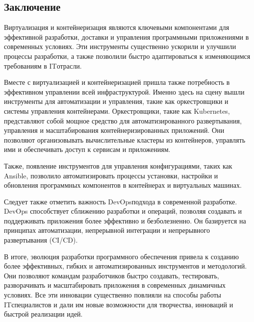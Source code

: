 \documentclass[letterpaper,10pt,russian]{sphinxmanual}
\begin{document}
\subsection{Заключение}
\label{\detokenize{educational_materials/docker_base/content:id12}}
\sphinxAtStartPar
Виртуализация и контейнеризация являются ключевыми компонентами для эффективной разработки, доставки и управления программными приложениями в современных условиях. Эти инструменты существенно ускорили и улучшили процессы разработки, а также позволили быстро адаптироваться к изменяющимся требованиям в IT\sphinxhyphen{}отрасли.

\sphinxAtStartPar
Вместе с виртуализацией и контейнеризацией пришла также потребность в эффективном управлении всей инфраструктурой. Именно здесь на сцену вышли инструменты для автоматизации и управления, такие как оркестровщики и системы управления контейнерами. Оркестровщики, такие как Kubernetes, представляют собой мощное средство для автоматизированного развертывания, управления и масштабирования контейнеризированных приложений. Они позволяют организовывать вычислительные кластеры из контейнеров, управлять ими и обеспечивать доступ к сервисам и приложениям.

\sphinxAtStartPar
Также, появление инструментов для управления конфигурациями, таких как Ansible, позволило автоматизировать процессы установки, настройки и обновления программных компонентов в контейнерах и виртуальных машинах.

\sphinxAtStartPar
Следует также отметить важность DevOps\sphinxhyphen{}подхода в современной разработке. DevOps способствует сближению разработки и операций, позволяя создавать и поддерживать приложения более эффективно и безболезненно. Он базируется на принципах автоматизации, непрерывной интеграции и непрерывного развертывания (CI/CD).

\sphinxAtStartPar
В итоге, эволюция разработки программного обеспечения привела к созданию более эффективных, гибких и автоматизированных инструментов и методологий. Они позволяют командам разработчиков быстро создавать, тестировать, разворачивать и масштабировать приложения в современных динамичных условиях. Все эти инновации существенно повлияли на способы работы IT\sphinxhyphen{}специалистов и дали им новые возможности для творчества, инноваций и быстрой реализации идей.
\end{document}
